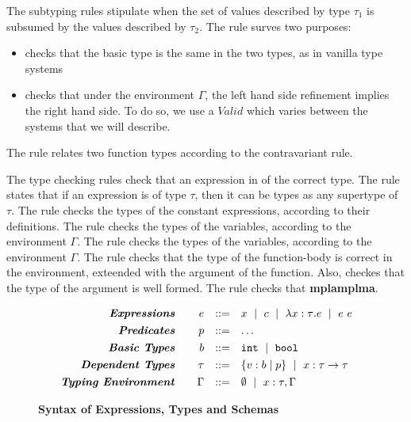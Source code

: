 The subtyping rules stipulate when the set of values described 
by type $\tau_1$ is subsumed by the values described by $\tau_2$.
%
The rule \tsubBase surves two purposes:
\begin{itemize}
\item checks that the basic type is the same in the two types, 
as in vanilla type systems
\item checks that under the environment $\Gamma$, 
the left hand side refinement implies the right hand side.
To do so, we use a $Valid$ which varies between the systems that we will describe.
\end{itemize}
The rule \tsubFun relates two function types according to the contravariant rule.

The type checking rules check that an expression in of the correct type.
The rule \tsub states that if an expression is of type $\tau$, 
then it can be types as any supertype of $\tau$.
The rule \tconst checks the types of the constant expressions, according 
to their definitions.
The rule \tvar checks the types of the variables, according 
to the environment $\Gamma$.
The rule \tfun checks the types of the variables, according 
to the environment $\Gamma$.
The rule \tfunction checks that the type of the function-body
is correct in the environment, exteended with the argument of the function.
Also, checkes that the type of the argument is well formed. 
The rule \tapp checks that \textbf{mplamplma}.


\begin{figure}[t!]
\centering
$$
\begin{array}{rrcl}
\emphbf{Expressions} \quad 
  & e 
  & ::= 
  &      x 
  \spmid c 
  \spmid \efunt{x}{\tau}{e} 
  \spmid \eapp{e}{e} 
  \\[0.05in] 

\emphbf{Predicates} \quad 
  & p
  & ::= 
  & \dots
  \\[0.05in] 

\emphbf{Basic Types} \quad 
  & b 
  & ::= 
  &      \tbint
  \spmid \tbbool
  \\[0.05in]

\emphbf{Dependent Types} \quad 
  & \tau 
  & ::= 
  &      \tref{b}{p} 
  \spmid \tfun{x}{\tau}{\tau}
  \\[0.05in]

\emphbf{Typing Environment} \quad 
  & \Gamma 
  & ::= 
  &      \emptyset 
  \spmid x:\tau, \Gamma

\end{array}
$$
\caption{\textbf{Syntax of Expressions, Types and Schemas}}
\label{fig:syntax}
\end{figure}


